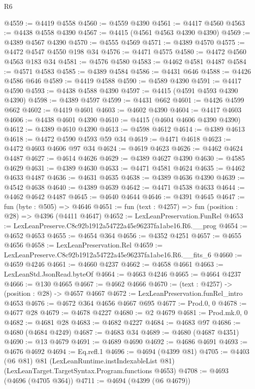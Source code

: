 \begin{lexlean}{R6}
\begin{coremodule}
@4559 := @4419 @4558
@4560 := @4559 @4390
@4561 := @4417 @4560
@4563 := @4438 @4558 @4390
@4567 := @4415 (@4561 @4563 @4390 @4390)
@4569 := @4389 @4567 @4390
@4570 := @4555 @4569
@4571 := @4389 @4570
@4575 := @4472 @4547 @4550 @198 @34
@4576 := @4471 @4575
@4580 := @4472 @4560 @4563 @183 @34
@4581 := @4576 @4580
@4583 := @4462 @4581 @4487
@4584 := @4571 @4583
@4585 := @4389 @4584
@4586 := @4431 @646
@4588 := @4426 @4586 @646
@4589 := @4419 @4588
@4590 := @4589 @4390
@4591 := @4417 @4590
@4593 := @4438 @4588 @4390
@4597 := @4415 (@4591 @4593 @4390 @4390)
@4598 := @4389 @4597
@4599 := @4431 @662
@4601 := @4426 @4599 @662
@4602 := @4419 @4601
@4603 := @4602 @4390
@4604 := @4417 @4603
@4606 := @4438 @4601 @4390
@4610 := @4415 (@4604 @4606 @4390 @4390)
@4612 := @4389 @4610 @4390
@4613 := @4598 @4612
@4614 := @4389 @4613
@4618 := @4472 @4590 @4593 @59 @34
@4619 := @4471 @4618
@4623 := @4472 @4603 @4606 @97 @34
@4624 := @4619 @4623
@4626 := @4462 @4624 @4487
@4627 := @4614 @4626
@4629 := @4389 @4627 @4390
@4630 := @4585 @4629
@4631 := @4389 @4630
@4633 := @4471 @4581 @4624
@4635 := @4462 @4633 @4487
@4636 := @4631 @4635
@4638 := @4389 @4636 @4390
@4639 := @4542 @4638
@4640 := @4389 @4639
@4642 := @4471 @4538 @4633
@4644 := @4462 @4642 @4487
@4645 := @4640 @4644
@4646 := @4391 @4645
@4647 := fun (byte : @505) => @4646
@4651 := fun (text : @4257) => fun (position : @28) => @4396 (@4411 @4647)
@4652 := LexLeanPreservation.FunRel
@4653 := LexLeanPreserve.C8c92b1912a54722a45e96237fa1abe16.R6.__prog
@4654 := @4652 @4653
@4655 := @4654 @364
@4656 := @4352 @4251
@4657 := @4655 @4656
@4658 := LexLeanPreservation.Rel
@4659 := LexLeanPreserve.C8c92b1912a54722a45e96237fa1abe16.R6.__fits_6
@4660 := @4659 @4246
@4661 := @4660 @4237
@4662 := @4658 @4661
@4663 := LexLeanStd.JsonRead.byteOf
@4664 := @4663 @4246
@4665 := @4664 @4237
@4666 := @130 @4665
@4667 := @4662 @4666
@4670 := (text : @4257) -> (position : @28) -> @4657 @4667
@4672 := LexLeanPreservation.funRel_intro @4653
@4676 := @4672 @364 @4656 @4667 @695
@4677 := Prod.{0, 0}
@4678 := @4677 @28
@4679 := @4678 @4227
@4680 := @2 @4679
@4681 := Prod.mk.{0, 0}
@4682 := @4681 @28
@4683 := @4682 @4227
@4684 := @4683 @97
@4686 := @4680 (@4684 @4249)
@4687 := @4683 @34
@4689 := @4680 (@4687 @4351)
@4690 := @13 @4679
@4691 := @4689 @4690
@4692 := @4686 @4691
@4693 := @4676 @4692
@4694 := Eq.refl.{1}
@4696 := @4694 (@4399 @81)
@4705 := @4403
    (@6 @81)
    @81
    (LexLeanRuntime.instIndexableList @81)
    (LexLeanTarget.TargetSyntax.Program.functions @4653)
@4708 := @4693 (@4696 (@4705 @364))
@4711 := @4694 (@4399 (@6 @4679))

\end{coremodule}
\end{lexlean}
